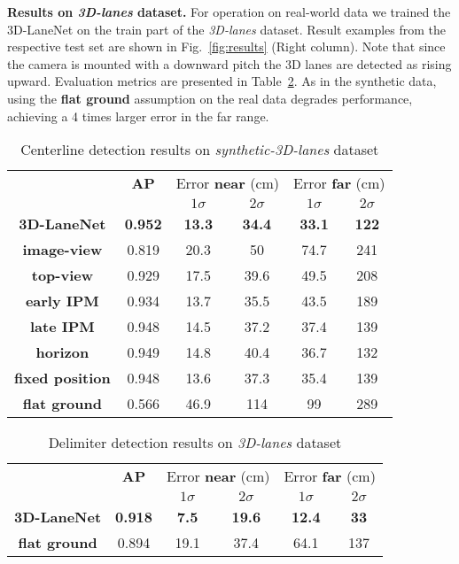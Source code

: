 \documentclass[10pt,twocolumn,letterpaper]{article}
\begin{document}
\textbf{Results on \textit{3D-lanes} dataset.} For operation on real-world data we trained the 3D-LaneNet on the train part of the \textit{3D-lanes} dataset. Result examples from the respective test set are shown in Fig.~\ref{fig:results} (Right column). Note that since the camera is mounted with a downward pitch the 3D lanes are detected as rising upward. Evaluation metrics are presented in Table~\ref{tab:real}. As in the synthetic data, using the \textbf{flat ground} assumption on the real data degrades performance, achieving a 4 times larger error in the far range.


\setlength{\heavyrulewidth}{1.5pt}
\setlength{\abovetopsep}{4pt}
\begin{table}[!htbp]
	\centering
	\caption{Centerline detection results on \emph{synthetic-3D-lanes} dataset}
	\begin{tabular}
		{*6c}
		\toprule
		& \textbf{AP} &   \multicolumn{2}{c}{Error \textbf{near} (cm)} & \multicolumn{2}{c}{Error \textbf{far} (cm)}   \\ 
		&    & $1\sigma$ & $2\sigma$ & $1\sigma$ & $2\sigma$\\
		\textbf{3D-LaneNet} & \textbf{0.952}	& \textbf{13.3}& 	\textbf{34.4}& 	\textbf{33.1}& 	\textbf{122}\\
		\textbf{image-view} & 0.819	& 20.3 & 50	& 74.7	& 241  \\ 
		\textbf{top-view} & 0.929 &	17.5 &	39.6 & 49.5 & 208  \\ 
		\textbf{early IPM } & 0.934 & 13.7	 & 35.5 & 43.5 & 189 \\ 
		\textbf{late IPM } & 0.948	&14.5	&37.2	& 37.4	&139  \\ 
		\midrule 
		
		\textbf{horizon} &0.949	&14.8&	40.4&	36.7&	132	  \\ 	
		\textbf{fixed position }	& 0.948	& 13.6	& 37.3	& 35.4	& 139  \\ 	
		\midrule 
		\textbf{flat ground}&0.566	& 46.9 & 114	& 99	& 289  \\ 	
		\bottomrule
	\end{tabular} 	\label{tab:ablation}
\end{table}

\setlength{\heavyrulewidth}{1.5pt}
\setlength{\abovetopsep}{4pt}
\begin{table}[!htbp]
	\centering
	\caption{Delimiter detection results on \emph{3D-lanes} dataset}
	\begin{tabular}
		{*6c}
		\toprule
		& \textbf{AP} &   \multicolumn{2}{c}{Error \textbf{near} (cm)} & \multicolumn{2}{c}{Error \textbf{far} (cm)}   \\ 
		&    & $1\sigma$ & $2\sigma$ & $1\sigma$ & $2\sigma$\\
		\textbf{3D-LaneNet} & \textbf{0.918}	& \textbf{7.5}& 	\textbf{19.6}& 	\textbf{12.4}& 	\textbf{33}\\
		\midrule 
		\textbf{flat ground} & 0.894 & 19.1 &	37.4 & 64.1	& 137  \\ 	
		\bottomrule
	\end{tabular} 	\label{tab:real}
\end{table}
\end{document}

